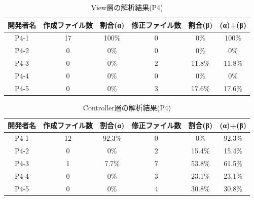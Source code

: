\documentclass{funthesis}
\begin{document}
\begin{table}[H]
  \begin{center}
\begin{tabular}{|c|c|c|c|c||c|}\hline
開発者名&作成ファイル数&割合(α)&修正ファイル数&割合(β)&(α)+(β)\\ \hline
P4-1 & 17 & 100\% & 0 & 0\% & 100\%\\ \hline \hline
P4-2 & 0 & 0\% & 0 & 0\% & 0\%\\ \hline \hline
P4-3 & 0 & 0\% & 2 & 11.8\% & 11.8\%\\ \hline \hline
P4-4 & 0 & 0\% & 0 & 0\% & 0\%\\ \hline \hline
P4-5 & 0 & 0\% & 3 & 17.6\% & 17.6\%\\ \hline 
\end{tabular}    
\caption{View層の解析結果(P4)}    \label{sample}
  \end{center}
\end{table}\begin{table}[H]
  \begin{center}
\begin{tabular}{|c|c|c|c|c||c|}\hline
開発者名&作成ファイル数&割合(α)&修正ファイル数&割合(β)&(α)+(β)\\ \hline
P4-1 & 12 & 92.3\% & 0 & 0\% & 92.3\%\\ \hline \hline
P4-2 & 0 & 0\% & 2 & 15.4\% & 15.4\%\\ \hline \hline
P4-3 & 1 & 7.7\% & 7 & 53.8\% & 61.5\%\\ \hline \hline
P4-4 & 0 & 0\% & 3 & 23.1\% & 23.1\%\\ \hline \hline
P4-5 & 0 & 0\% & 4 & 30.8\% & 30.8\%\\ \hline  
\end{tabular}    
\caption{Controller層の解析結果(P4)}    \label{sample}
  \end{center}
\end{table}
\end{document}
